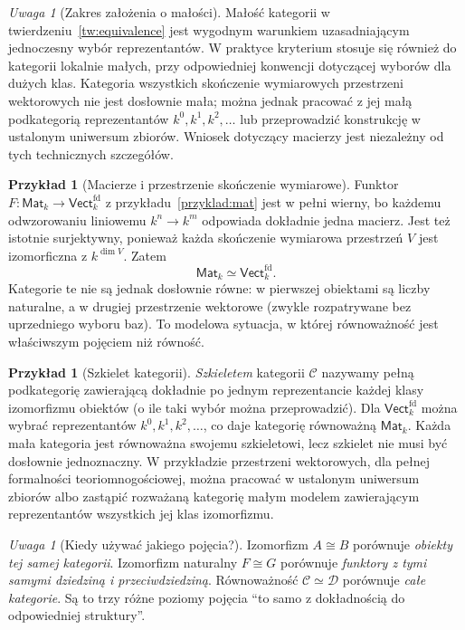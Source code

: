 \documentclass[11pt,a4paper]{article}
\numberwithin{equation}{section}
\theoremstyle{plain}
\theoremstyle{definition}
\newtheorem{przyklad}[twierdzenie]{Przykład}
\theoremstyle{remark}
\newtheorem{uwaga}[twierdzenie]{Uwaga}
\newcommand{\cat}[1]{\mathsf{#1}}
\newcommand{\Vect}{\cat{Vect}}
\begin{document}
\begin{uwaga}[Zakres założenia o małości]
Małość kategorii w twierdzeniu~\ref{tw:equivalence} jest wygodnym warunkiem uzasadniającym jednoczesny wybór reprezentantów. W praktyce kryterium stosuje się również do kategorii lokalnie małych, przy odpowiedniej konwencji dotyczącej wyborów dla dużych klas. Kategoria wszystkich skończenie wymiarowych przestrzeni wektorowych nie jest dosłownie mała; można jednak pracować z jej małą podkategorią reprezentantów $k^0,k^1,k^2,\ldots$ lub przeprowadzić konstrukcję w ustalonym uniwersum zbiorów. Wniosek dotyczący macierzy jest niezależny od tych technicznych szczegółów.
\end{uwaga}


\begin{przyklad}[Macierze i przestrzenie skończenie wymiarowe]\label{przyklad:mat-equivalence}
Funktor $F:\cat{Mat}_k\to\Vect_k^{\mathrm{fd}}$ z przykładu~\ref{przyklad:mat} jest w pełni wierny, bo każdemu odwzorowaniu liniowemu $k^n\to k^m$ odpowiada dokładnie jedna macierz. Jest też istotnie surjektywny, ponieważ każda skończenie wymiarowa przestrzeń $V$ jest izomorficzna z $k^{\dim V}$. Zatem
\[
\cat{Mat}_k\simeq\Vect_k^{\mathrm{fd}}.
\]
Kategorie te nie są jednak dosłownie równe: w pierwszej obiektami są liczby naturalne, a w drugiej przestrzenie wektorowe (zwykle rozpatrywane bez uprzedniego wyboru baz). To modelowa sytuacja, w której równoważność jest właściwszym pojęciem niż równość.
\end{przyklad}

\begin{przyklad}[Szkielet kategorii]
\emph{Szkieletem} kategorii $\mathcal C$ nazywamy pełną podkategorię zawierającą dokładnie po jednym reprezentancie każdej klasy izomorfizmu obiektów (o ile taki wybór można przeprowadzić). Dla $\Vect_k^{\mathrm{fd}}$ można wybrać reprezentantów $k^0,k^1,k^2,\ldots$, co daje kategorię równoważną $\cat{Mat}_k$. Każda mała kategoria jest równoważna swojemu szkieletowi, lecz szkielet nie musi być dosłownie jednoznaczny. W przykładzie przestrzeni wektorowych, dla pełnej formalności teoriomnogościowej, można pracować w ustalonym uniwersum zbiorów albo zastąpić rozważaną kategorię małym modelem zawierającym reprezentantów wszystkich jej klas izomorfizmu.
\end{przyklad}

\begin{uwaga}[Kiedy używać jakiego pojęcia?]
Izomorfizm $A\cong B$ porównuje \emph{obiekty tej samej kategorii}. Izomorfizm naturalny $F\cong G$ porównuje \emph{funktory z tymi samymi dziedziną i przeciwdziedziną}. Równoważność $\mathcal C\simeq\mathcal D$ porównuje \emph{całe kategorie}. Są to trzy różne poziomy pojęcia ``to samo z dokładnością do odpowiedniej struktury''.
\end{uwaga}
\end{document}
